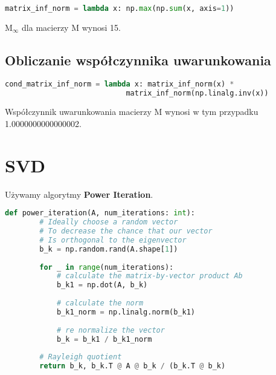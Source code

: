 \documentclass[12pt,a4paper,table]{article}
\begin{document}
    \begin{lstlisting}[language=Python]
    matrix_inf_norm = lambda x: np.max(np.sum(x, axis=1))
    \end{lstlisting}

    M$_\infty$ dla macierzy M wynosi 15.
    
    \subsection{Obliczanie współczynnika uwarunkowania}

    \begin{lstlisting}[language=Python]
    cond_matrix_inf_norm = lambda x: matrix_inf_norm(x) * 
                            matrix_inf_norm(np.linalg.inv(x))
    \end{lstlisting}

    \vspace{1em}
    Współczynnik uwarunkowania macierzy M wynosi w tym przypadku 1.0000000000000002.
    
    \section{SVD}
    Używamy algorytmy \textbf{Power Iteration}.

    \begin{lstlisting}[language=Python]
    def power_iteration(A, num_iterations: int):
        # Ideally choose a random vector
        # To decrease the chance that our vector
        # Is orthogonal to the eigenvector
        b_k = np.random.rand(A.shape[1])
    
        for _ in range(num_iterations):
            # calculate the matrix-by-vector product Ab
            b_k1 = np.dot(A, b_k)
    
            # calculate the norm
            b_k1_norm = np.linalg.norm(b_k1)
    
            # re normalize the vector
            b_k = b_k1 / b_k1_norm
    
        # Rayleigh quotient
        return b_k, b_k.T @ A @ b_k / (b_k.T @ b_k)
    \end{lstlisting}
    
\end{document}
